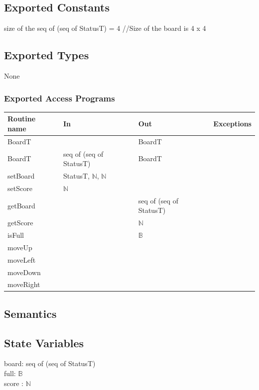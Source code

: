 \documentclass[12pt]{article}
\begin{document}
\subsection*{Exported Constants}

size of the seq of (seq of StatusT) = 4 \quad //Size of the board is 4 x 4

\subsection*{Exported Types}

None

\subsubsection* {Exported Access Programs}

\begin{tabular}{| l | l | l | p{6cm} |}
\hline
\textbf{Routine name} & \textbf{In} & \textbf{Out} & \textbf{Exceptions}\\
\hline
BoardT &  & BoardT & \\
\hline
BoardT & seq of (seq of StatusT) & BoardT & \\
\hline
setBoard & StatusT, $\mathbb{N}$, $\mathbb{N}$ &  & \\
\hline
setScore & $\mathbb{N}$ &  & \\
\hline
getBoard &  & seq of (seq of StatusT) & \\
\hline
getScore &  & $\mathbb{N}$ & \\
\hline
isFull &  & $\mathbb{B}$ & \\
\hline
moveUp &  &  & \\
\hline
moveLeft &  &  & \\
\hline
moveDown &  &  & \\
\hline
moveRight &  &  & \\
\hline

\end{tabular}

\subsection* {Semantics}

\subsection*{State Variables}

board: seq of (seq of StatusT) \\
full: $\mathbb{B}$ \\
score : $\mathbb{N}$ 
\end{document}
